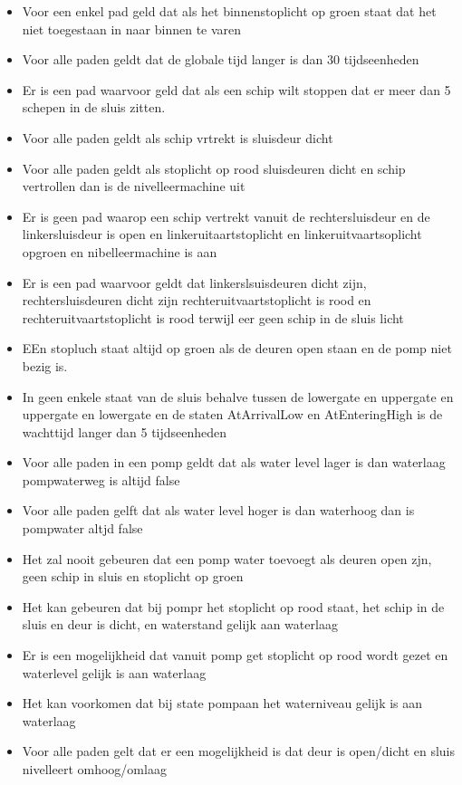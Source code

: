 \begin{itemize}
	\item Voor een enkel pad geld dat als het binnenstoplicht op groen staat dat het niet toegestaan in naar binnen te varen
	\item Voor alle paden geldt dat de globale tijd langer is dan 30 tijdseenheden
	\item Er is een pad waarvoor geld dat als een schip wilt stoppen dat er meer dan 5 schepen in de sluis zitten.
	\item Voor alle paden geldt als schip vrtrekt is sluisdeur dicht
	\item Voor alle paden geldt als stoplicht op rood sluisdeuren dicht en schip vertrollen dan is de nivelleermachine uit
	\item Er is geen pad waarop een schip vertrekt vanuit de rechtersluisdeur en de linkersluisdeur is open en linkeruitaartstoplicht en linkeruitvaartsoplicht opgroen  en nibelleermachine is aan
	\item Er is een pad waarvoor geldt dat linkerslsuisdeuren dicht zijn, rechtersluisdeuren dicht zijn rechteruitvaartstoplicht is rood en rechteruitvaartstoplicht is  rood terwijl eer geen schip in de sluis licht
	\item  EEn stopluch staat altijd op groen als de deuren open staan en de pomp niet bezig is.
	\item  In geen enkele staat van de sluis behalve tussen de lowergate en uppergate en uppergate en lowergate en de staten AtArrivalLow en AtEnteringHigh is de wachttijd langer dan 5 tijdseenheden
	\item Voor alle paden in een pomp geldt dat als water level lager is dan waterlaag pompwaterweg is altijd false
	\item Voor alle paden gelft dat als water level hoger is dan waterhoog dan is pompwater altjd false
	\item  Het zal nooit gebeuren dat een pomp water toevoegt als deuren open zjn, geen schip in sluis en stoplicht op groen
	\item  Het kan gebeuren dat bij pompr het stoplicht op rood staat, het schip in de sluis en deur is dicht, en waterstand gelijk aan waterlaag
	\item Er is een mogelijkheid  dat vanuit pomp get stoplicht op rood wordt gezet en waterlevel gelijk is aan waterlaag
	\item  Het kan voorkomen dat bij state pompaan het waterniveau gelijk is aan waterlaag
	\item   Voor alle paden gelt dat er een mogelijkheid is dat deur is open/dicht en sluis nivelleert omhoog/omlaag
	
\end{itemize}




